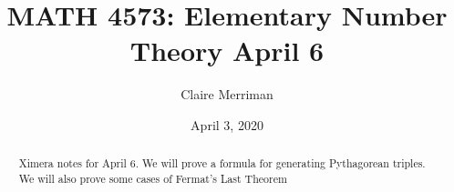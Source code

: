 \documentclass{xourse}
\title{MATH 4573: Elementary Number Theory April 6}
\author{Claire Merriman}
\date{April 3, 2020}
\begin{document}
  
\begin{abstract} %
Ximera notes for April 6. We will prove a formula for generating Pythagorean triples. We will also prove some cases of Fermat's Last Theorem
\end{abstract}  
\maketitle 
 
 
\end{document}
